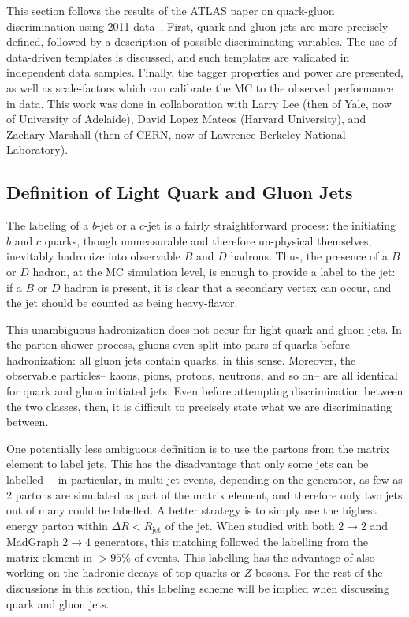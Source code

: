 This section follows the results of the ATLAS paper on quark-gluon discrimination using 2011 data~\cite{ATLASqg}. First, quark and gluon jets are more precisely defined, followed by a description of possible discriminating variables. The use of data-driven templates is discussed, and such templates are validated in independent data samples. Finally, the tagger properties and power are presented, as well as scale-factors which can calibrate the MC to the observed performance in data. This work was done in collaboration with Larry Lee (then of Yale, now of University of Adelaide), David Lopez Mateos (Harvard University), and Zachary Marshall (then of CERN, now of Lawrence Berkeley National Laboratory).

\subsection{Definition of Light Quark and Gluon Jets}
\label{jet-reconstruction:qg:definition}

The labeling of a $b$-jet or a $c$-jet is a fairly straightforward process: the initiating $b$ and $c$ quarks, though unmeasurable and therefore un-physical themselves, inevitably hadronize into observable $B$ and $D$ hadrons. Thus, the presence of a $B$ or $D$ hadron, at the MC simulation level, is enough to provide a label to the jet: if a $B$ or $D$ hadron is present, it is clear that a secondary vertex can occur, and the jet should be counted as being heavy-flavor.

This unambiguous hadronization does not occur for light-quark and gluon jets. In the parton shower process, gluons even split into pairs of quarks before hadronization: all gluon jets contain quarks, in this sense. Moreover, the observable particles-- kaons, pions, protons, neutrons, and so on-- are all identical for quark and gluon initiated jets. Even before attempting discrimination between the two classes, then, it is difficult to precisely state what we are discriminating between.

One potentially less ambiguous definition is to use the partons from the matrix element to label jets. This has the disadvantage that only some jets can be labelled--- in particular, in multi-jet events, depending on the generator, as few as 2 partons are simulated as part of the matrix element, and therefore only two jets out of many could be labelled. A better strategy is to simply use the highest energy parton within $\Delta R < R_\mathrm{jet}$ of the jet. When studied with both \Pythia $2\rightarrow2$ and MadGraph $2\rightarrow4$ generators, this matching followed the labelling from the matrix element in $> 95\%$ of events. This labelling has the advantage of also working on the hadronic decays of top quarks or $Z$-bosons. For the rest of the discussions in this section, this labeling scheme will be implied when discussing quark and gluon jets.

